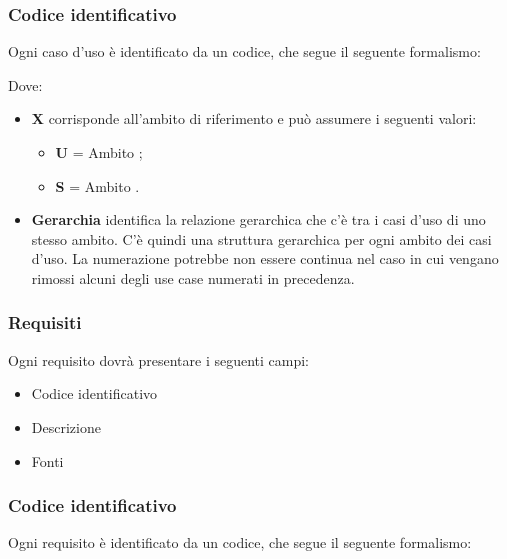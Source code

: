 \subsubsection{Codice identificativo}

Ogni caso d'uso è identificato da un codice, che segue il seguente formalismo:
\begin{center}
\end{center}

Dove:
\begin{itemize}
 \item \textbf{X} corrisponde all'ambito di riferimento e può assumere i seguenti valori:
    \begin{itemize}
     \item[] \textbf{U} = Ambito ;
     \item[] \textbf{S} = Ambito .
    \end{itemize}

     \item \textbf{Gerarchia} identifica la relazione gerarchica che c'è tra i casi d'uso di uno stesso ambito. C'è quindi una struttura gerarchica per ogni ambito dei casi d'uso. La numerazione potrebbe non essere continua nel caso in cui vengano rimossi alcuni degli use case numerati in precedenza.
\end{itemize}

\subsubsection{Requisiti}

Ogni requisito dovrà presentare i seguenti campi:
\begin{itemize}
 \item Codice identificativo
 \item Descrizione
 \item Fonti
\end{itemize}

\subsubsection{Codice identificativo}

Ogni requisito è identificato da un codice, che segue il seguente formalismo:
\begin{center}
\end{center}

